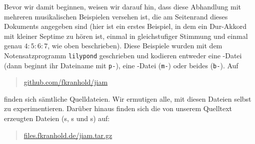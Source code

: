 
Bevor wir damit beginnen, weisen wir darauf hin, dass diese Abhandlung mit
mehreren musikalischen Beispielen versehen ist, die am Seitenrand dieses
Dokuments angegeben sind (hier ist ein erstes Beispiel, in dem ein
Dur-Akkord mit kleiner Septime zu hören ist, einmal in gleichstufiger Stimmung
und einmal genau \mbox{$4:5:6:7$}, wie oben beschrieben). Diese Beispiele wurden
mit dem Notensatzprogramm \verb!lilypond! geschrieben und kodieren entweder eine
-Datei (dann beginnt ihr Dateiname mit \verb!p-!), eine
-Datei (\verb!m-!) oder beides (\verb!b-!). Auf
\begin{quote}
  \href{https://github.com/fkranhold/jiam/}{\textsf{github.com/fkranhold/jiam}}
\end{quote}
finden sich sämtliche Quelldateien.  Wir ermutigen alle, mit diesen Dateien
selbst zu experimentieren. Darüber hinaus finden sich die von unserem Quelltext
erzeugten Dateien (s, s und s) auf:
\begin{quote}
  \href{https://files.fkranhold.de/jiam.tar.gz}{\textsf{files.fkranhold.de/jiam.tar.gz}}
\end{quote}

